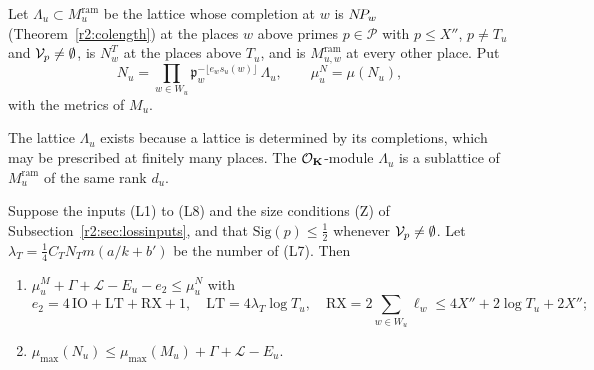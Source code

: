 \begin{definition}\label{r2:Nu}
Let $\Lambda_u\subset M^{\mathrm{ram}}_u$ be the lattice whose completion at $w$ is $N\!P_w$ (Theorem~\ref{r2:colength}) at the places $w$ above primes $p\in\mathcal P$ with $p\le X''$, $p\ne T_u$ and $\mathcal V_p\ne\emptyset$, is $N^T_w$ at the places above $T_u$, and is $M^{\mathrm{ram}}_{u,w}$ at every other place. Put
\[
N_u=\prod_{w\in W_u}\mathfrak p_w^{-\lfloor e_ws_u(w)\rfloor}\,\Lambda_u,\qquad \mu^N_u=\mu(N_u),
\]
with the metrics of $M_u$.
\end{definition}

The lattice $\Lambda_u$ exists because a lattice is determined by its completions, which may be prescribed at finitely many places. The $\mathcal O_\mathbf K$-module $\Lambda_u$ is a sublattice of $M^{\mathrm{ram}}_u$ of the same rank $d_u$.

\begin{theorem}\label{r2:A2}
Suppose the inputs (L1) to (L8) and the size conditions (Z) of Subsection~\ref{r2:sec:lossinputs}, and that $\mathrm{Sig}(p)\le\frac12$ whenever $\mathcal V_p\ne\emptyset$. Let $\lambda_T=\frac14C_TN_Tm(a/k+b')$ be the number of (L7). Then
\begin{enumerate}
\item[(i)] $\mu^M_u+\Gamma+\mathcal L-E_u-e_2\le\mu^N_u$ with
\[
e_2=4\,\mathrm{IO}+\mathrm{LT}+\mathrm{RX}+1,\quad\mathrm{LT}=4\lambda_T\log T_u,\quad\mathrm{RX}=2\sum_{w\in W_u}\ell_w\le4X''+2\log T_u+2X'' ;
\]
\item[(ii)] $\mu_{\max}(N_u)\le\mu_{\max}(M_u)+\Gamma+\mathcal L-E_u$.
\end{enumerate}
\end{theorem}

